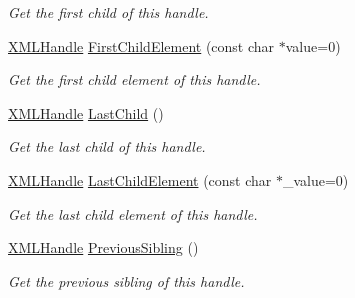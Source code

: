 \begin{DoxyCompactItemize}
\begin{DoxyCompactList}\small\item\em Get the first child of this handle. \end{DoxyCompactList}\item 
\mbox{\label{classtinyxml2_1_1XMLHandle_a99edff695a3cd3feff8a329189140a33}} 
\hyperlink{classtinyxml2_1_1XMLHandle}{X\+M\+L\+Handle} \hyperlink{classtinyxml2_1_1XMLHandle_a99edff695a3cd3feff8a329189140a33}{First\+Child\+Element} (const char $\ast$value=0)
\begin{DoxyCompactList}\small\item\em Get the first child element of this handle. \end{DoxyCompactList}\item 
\mbox{\label{classtinyxml2_1_1XMLHandle_a9d09f04435f0f2f7d0816b0198d0517b}} 
\hyperlink{classtinyxml2_1_1XMLHandle}{X\+M\+L\+Handle} \hyperlink{classtinyxml2_1_1XMLHandle_a9d09f04435f0f2f7d0816b0198d0517b}{Last\+Child} ()
\begin{DoxyCompactList}\small\item\em Get the last child of this handle. \end{DoxyCompactList}\item 
\mbox{\label{classtinyxml2_1_1XMLHandle_a4073e768ebc434b2605343b709a9a554}} 
\hyperlink{classtinyxml2_1_1XMLHandle}{X\+M\+L\+Handle} \hyperlink{classtinyxml2_1_1XMLHandle_a4073e768ebc434b2605343b709a9a554}{Last\+Child\+Element} (const char $\ast$\+\_\+value=0)
\begin{DoxyCompactList}\small\item\em Get the last child element of this handle. \end{DoxyCompactList}\item 
\mbox{\label{classtinyxml2_1_1XMLHandle_a428374e756f4db4cbc287fec64eae02c}} 
\hyperlink{classtinyxml2_1_1XMLHandle}{X\+M\+L\+Handle} \hyperlink{classtinyxml2_1_1XMLHandle_a428374e756f4db4cbc287fec64eae02c}{Previous\+Sibling} ()
\begin{DoxyCompactList}\small\item\em Get the previous sibling of this handle. \end{DoxyCompactList}\item 
\mbox{\label{classtinyxml2_1_1XMLHandle_a31a0d5d060292bec5df2b2efe2eca228}} 

\end{DoxyCompactItemize}

